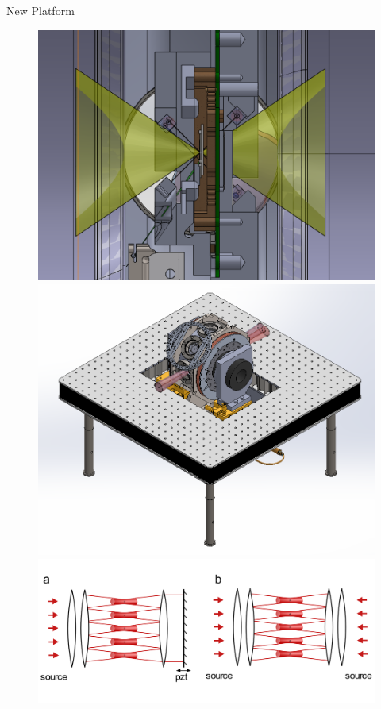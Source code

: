 \documentclass[final]{beamer}
\begin{document}
\begin{frame}{}
\begin{center}
\begin{columns}[t]
\begin{column}{0.49\textwidth}
\begin{alertblock}{New Platform}
      \begin{figure}
        \includegraphics[height=0.35\textwidth]{./figs/trap_NA.png}
        \includegraphics[height=0.35\textwidth]{./figs/exp_iso.png}
        \includegraphics[height=0.35\textwidth]{./figs/array_sw.png}
      \end{figure}

    \end{alertblock}

  \end{column}
\end{columns}

\end{center}
\end{frame}
\end{document}
